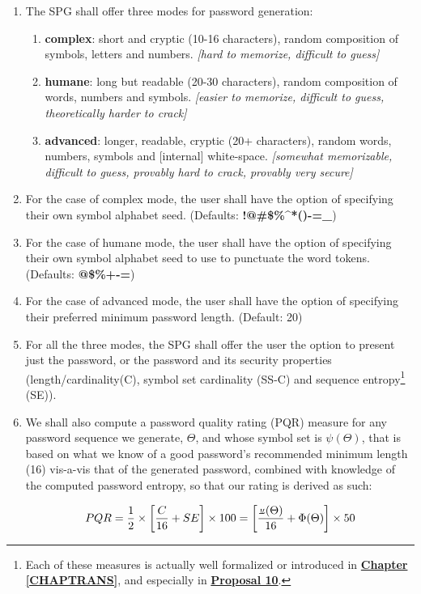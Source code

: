 \documentclass[a4paper, 18pt]{book} %
\newcommand{\invpi}{\rotatebox[origin=c]{180}{$\pi$}}
\begin{document}
{{{\begin{enumerate}
\item{ The SPG shall offer three modes for password generation:
\begin{enumerate}
\item \textbf{complex}: short and cryptic (10-16 characters), random composition of symbols, letters and numbers. \textit{[hard to memorize, difficult to guess]}
\item \textbf{humane}: long but readable (20-30 characters), random composition of words, numbers and symbols. \textit{[easier to memorize, difficult to guess, theoretically harder to crack]}
\item \textbf{advanced}: longer, readable, cryptic (20+ characters), random words, numbers, symbols and [internal] white-space. \textit{[somewhat memorizable, difficult to guess, provably hard to crack, provably very secure]}
\end{enumerate}
}
\item For the case of complex mode, the user shall have the option of specifying their own symbol alphabet seed. (Defaults: \textbf{!@\#\$\%\^{}*()-=\_})
\item For the case of humane mode, the user shall have the option of specifying their own symbol alphabet seed to use to punctuate the word tokens. (Defaults: \textbf{@\$\%+-=})
\item For the case of advanced mode, the user shall have the option of specifying their preferred minimum password length. (Default: 20)
\item For all the three modes, the SPG shall offer the user the option to present just the password, or the password and its security properties (length/cardinality(C), symbol set cardinality (SS-C) and sequence entropy\footnote{Each of these measures is actually well formalized or introduced in \textbf{\hyperref[CHAPTRANS]{Chapter \ref{CHAPTRANS}}}, and especially in \textbf{\hyperref[PROPTOE]{Proposal 10}}.} (SE)).
\item{We shall also compute a password quality rating (PQR) measure for any password sequence we generate, $\Theta$, and whose symbol set is $\psi(\Theta)$, that is based on what we know of a good password's recommended minimum length (16) vis-a-vis that of the generated password, combined with knowledge of the computed password entropy, so that our rating is derived as such:



\vspace{1em}
\begin{equation}
PQR = \frac{1}{2} \times \left[\frac{C}{16} + SE \right] \times 100 =  \left[\frac{\invpi(\Theta)}{16} + \Phi(\Theta) \right] \times 50
\end{equation}
\vspace{1em}

}
\end{enumerate}}}}
\end{document}
